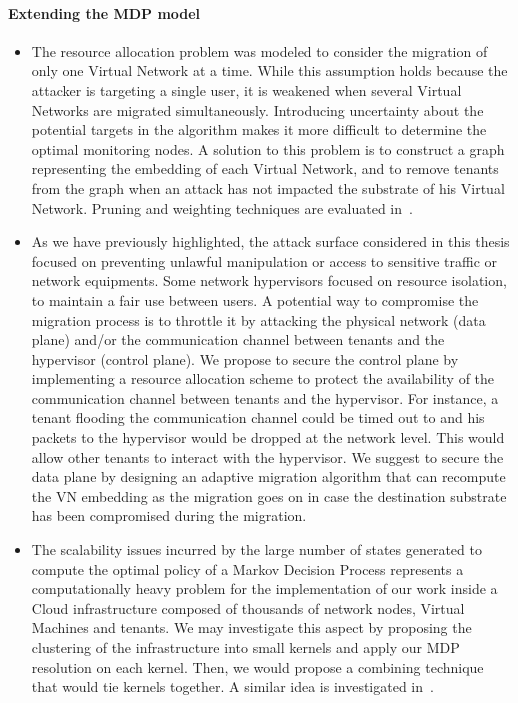 \paragraph{Extending the MDP model}
\begin{itemize}
    \item 
    The resource allocation problem was modeled to consider the migration of only one Virtual Network at a time. While this assumption holds because the attacker is targeting a single user, it is weakened when several Virtual Networks are migrated simultaneously. Introducing uncertainty about the potential targets in the algorithm makes it more difficult to determine the optimal monitoring nodes. A solution to this problem is to construct a graph representing the embedding of each Virtual Network, and to remove tenants from the graph when an attack has not impacted the substrate of his Virtual Network. Pruning and weighting techniques are evaluated in~\cite{pruning-secu}.

    \item 
    As we have previously highlighted, the attack surface considered in this thesis focused on preventing unlawful manipulation or access to sensitive traffic or network equipments. Some network hypervisors focused on resource isolation, to maintain a fair use between users. A potential way to compromise the migration process is to throttle it by attacking the physical network (data plane) and/or the communication channel between tenants and the hypervisor (control plane). We propose to secure the control plane by implementing a resource allocation scheme to protect the availability of the communication channel between tenants and the hypervisor. For instance, a tenant flooding the communication channel could be timed out to and his packets to the hypervisor would be dropped at the network level. This would allow other tenants to interact with the hypervisor. We suggest to secure the data plane by designing an adaptive migration algorithm that can recompute the VN embedding as the migration goes on in case the destination substrate has been compromised during the migration. 

    \item 
    The scalability issues incurred by the large number of states generated to compute the optimal policy of a Markov Decision Process represents a computationally heavy problem for the implementation of our work inside a Cloud infrastructure composed of thousands of network nodes, Virtual Machines and tenants. We may investigate this aspect by proposing the clustering of the infrastructure into small kernels and apply our MDP resolution on each kernel. Then, we would propose a combining technique that would tie kernels together. A similar idea is investigated in~\cite{POMDP-clustering}.


\end{itemize}
